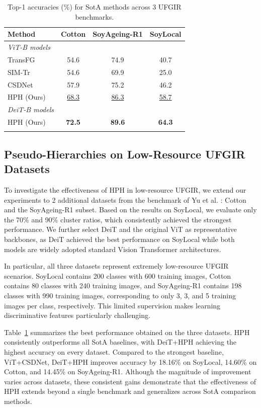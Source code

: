 \documentclass[conference,a4paper]{IEEEtran}
\begin{document}
\begin{table}[!t]
\centering
\caption{Top-1 accuracies (\%) for SotA methods across 3 UFGIR benchmarks.}
\begin{tabular}{lccc}
\toprule
Method & Cotton & SoyAgeing-R1 & SoyLocal \\
\midrule
\textit{ViT-B models} \\
TransFG\cite{he_transfg_2022}   & 54.6 & 74.9 & 40.7 \\
SIM-Tr\cite{sun_sim-trans_2022}    & 54.6 & 69.9 & 25.0 \\
CSDNet\cite{fang_learning_2024}    & 57.9 & 75.2 & 46.2 \\
HPH (Ours) & \underline{68.3} & \underline{86.3} & \underline{58.7} \\
\midrule
\textit{DeiT-B models} \\
HPH (Ours)     & \textbf{72.5} & \textbf{89.6} & \textbf{64.3} \\
\bottomrule
\label{tab_compare_othersoy}
\end{tabular}
\end{table}

\subsection{Pseudo-Hierarchies on Low-Resource UFGIR Datasets}
To investigate the effectiveness of HPH in low-resource UFGIR, we extend our experiments to 2 additional datasets from the benchmark of Yu et al. \cite{yu_benchmark_2021}: Cotton and the SoyAgeing-R1 subset. Based on the results on SoyLocal, we evaluate only the 70\% and 90\% cluster ratios, which consistently achieved the strongest performance. We further select DeiT and the original ViT as representative backbones, as DeiT achieved the best performance on SoyLocal while both models are widely adopted standard Vision Transformer architectures.

In particular, all three datasets represent extremely low-resource UFGIR scenarios. SoyLocal contains 200 classes with 600 training images, Cotton contains 80 classes with 240 training images, and SoyAgeing-R1 contains 198 classes with 990 training images, corresponding to only 3, 3, and 5 training images per class, respectively. This limited supervision makes learning discriminative features particularly challenging.

Table~\ref{tab_compare_othersoy} summarizes the best performance obtained on the three datasets. HPH consistently outperforms all SotA baselines, with DeiT+HPH achieving the highest accuracy on every dataset. Compared to the strongest baseline, ViT+CSDNet, DeiT+HPH improves accuracy by 18.16\% on SoyLocal, 14.60\% on Cotton, and 14.45\% on SoyAgeing-R1. Although the magnitude of improvement varies across datasets, these consistent gains demonstrate that the effectiveness of HPH extends beyond a single benchmark and generalizes across SotA comparison methods.
\end{document}
